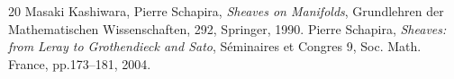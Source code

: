 \begin{thebibliography}{20} 
   Masaki Kashiwara, Pierre Schapira, 
    \textit{Sheaves on Manifolds}, 
    Grundlehren der Mathematischen Wissenschaften, 292, Springer, 1990.
   Pierre Schapira, 
    \textit{Sheaves: from Leray to Grothendieck and Sato}, 
    S\'eminaires et Congres 9, Soc. Math. France, pp.173--181, 2004.
\end{thebibliography}






